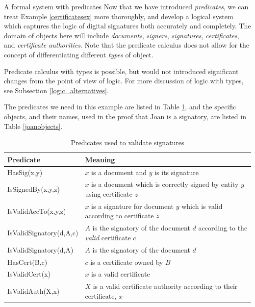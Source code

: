 \begin{example}{A formal system with predicates}\label{predicatesex}%
Now that we have introduced {\em predicates}, we can treat Example \ref{certificatesex}
more thoroughly, and develop a logical system which captures the logic of digital 
signatures both accurately and completely. The domain of objects here will include
{\em documents}, {\em signers}, {\em signatures}, {\em certificates}, and {\em certificate authorities}.
Note that the predicate calculus does not allow for the concept of differentiating
different {\em types} of object. 

Predicate calculus with types is possible, but would not introduced
significant changes from the point of view of logic. For more discussion of logic with
types, see Subsection \ref{logic_alternatives}.

The predicates we need in this example are listed in Table \ref{certificatepredicates},
and the specific objects, and their names, used in the proof that Joan is a signatory,
are listed in Table \ref{joanobjects}.

\begin{table}
\centering
\begin{tabular}{|@{\tt}l@{\hspace{2mm}}|p{75mm}|}
\hline
\bf Predicate&\bf Meaning\\
\hline
HasSig(x,y)& $x$ is a document and $y$ is its signature\\
IsSignedBy(x,y,z)& $x$ is a document which is correctly signed by entity $y$ using certificate $z$\\
IsValidAccTo(x,y,z)& $x$ is a signature for document $y$ which is valid according to certificate $z$\\ 
IsValidSignatory(d,A,c)& $A$ is the signatory of the document $d$ according to 
the {\em valid} certificate $c$\\
IsValidSignatory(d,A)& $A$ is the signatory of the document $d$\\
HasCert(B,c)& $c$ is a certificate owned by $B$\\
IsValidCert(x)& $x$ is a valid certificate\\
IsValidAuth(X,x)& $X$ is a valid certificate authority according to their certificate, $x$\\
\hline
\end{tabular}
\caption{Predicates used to validate signatures}\label{certificatepredicates}
\end{table}



\end{example}
